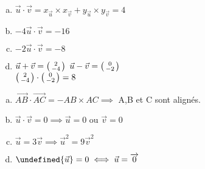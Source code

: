 \documentclass[12pt, a4paper]{article}
\let\norm\undefined %
\DeclarePairedDelimiter\norm{\lVert}{\rVert}
\DeclarePairedDelimiter\norm{\lVert}{\rVert}
\begin{document}
\begin{Exercise}[number={58}]
    \begin{enumerate}[a)]
        \item $\vec{u}\cdot\vec{v}=x_{\vec{u}}\times x_{\vec{v}}+y_{\vec{u}}\times y_{\vec{v}}=4$
        \item $-4\vec{u}\cdot\vec{v}=-16$
        \item $-2\vec{u}\cdot\vec{v}=-8$
        \item $\vec{u}+\vec{v}=\begin{psmallmatrix}2\\-4\end{psmallmatrix}$ \quad $\vec{u}-\vec{v}=\begin{psmallmatrix}0\\-2\end{psmallmatrix}$ \smallskip \\ $\begin{psmallmatrix}2\\-4\end{psmallmatrix}\cdot\begin{psmallmatrix}0\\-2\end{psmallmatrix}=8$
    \end{enumerate}
\end{Exercise}

\begin{Exercise}[number={60}]
    \begin{enumerate}[a)]
        \item $\overrightarrow{AB}\cdot\overrightarrow{AC}=-AB\times AC\implies$ A,B et C sont alignés.
        \item $\vec{u}\cdot\vec{v}=0\implies\vec{u}=0$ ou $\vec{v}=0$
        \item $\vec{u}=3\vec{v}\implies\vec{u}^2=9\vec{v}^2$
        \item $\norm{\vec{u}}=0\iff\vec{u}=\overrightarrow{0}$
    \end{enumerate}
\end{Exercise}
\end{document}
